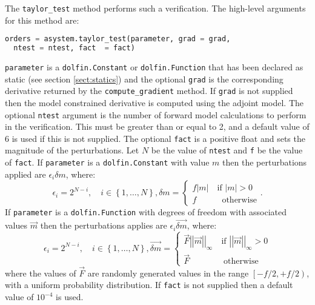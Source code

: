 \documentclass[a4paper]{book}
\begin{document}
The \verb+taylor_test+ method performs such a verification. The high-level
arguments for this method are:
\begin{lstlisting}[language = python, frame = single, basicstyle=\footnotesize]
orders = asystem.taylor_test(parameter, grad = grad,
  ntest = ntest, fact  = fact)
\end{lstlisting}
\verb+parameter+ is a \verb+dolfin.Constant+ or \verb+dolfin.Function+ that has
been declared as static (see section \ref{sect:statics}) and the optional
\verb+grad+ is the corresponding derivative returned by the
\verb+compute_gradient+ method. If \verb+grad+ is not supplied then the
model constrained derivative is computed using the adjoint model. The optional
\verb+ntest+ argument is the number of forward model calculations to perform in
the verification. This must be greater than or equal to 2, and a default value
of 6 is used if this is not supplied. The optional \verb+fact+ is a positive
float and sets the magnitude of the perturbations. Let $N$ be the value of
\verb+ntest+ and \verb+f+ be the value of \verb+fact+. If \verb+parameter+ is a
\verb+dolfin.Constant+ with value $m$ then the perturbations applied are
$\epsilon_i \delta m$, where:
\begin{subequations}
  \begin{equation}
    \epsilon_i = 2^{N - i}, \quad i \in \left\{1, \ldots, N \right\},
  \end{equation}
  \begin{equation}
    \delta m = \left\{ \begin{array}{l} f \left| m \right| \quad \textrm{if } \left| m \right| > 0 \\ f \qquad \quad \textrm{otherwise} \end{array} \right. .
  \end{equation}
\end{subequations}
If \verb+parameter+ is a \verb+dolfin.Function+ with degrees of freedom
with associated values $\vec{m}$ then the perturbations applies are
$\epsilon_i \vec{\delta m}$, where:
\begin{subequations}
  \begin{equation}
    \epsilon_i = 2^{N - i}, \quad i \in \left\{1, \ldots, N \right\},
  \end{equation}
  \begin{equation}
    \vec{\delta m} = \left\{ \begin{array}{l} \vec{F} \left|\left| \vec{m} \right|\right|_\infty \quad \textrm{if } \left|\left| \vec{m} \right|\right|_\infty > 0 \\ \vec{F} \qquad \qquad \textrm{otherwise} \end{array} \right.
  \end{equation}
\end{subequations}
where the values of $\vec{F}$ are randomly generated values in the range
$\left[ -f/2, +f/2 \right)$, with a uniform probability distribution. If
\verb+fact+ is not supplied then a default value of $10^{-4}$ is used.
\end{document}
